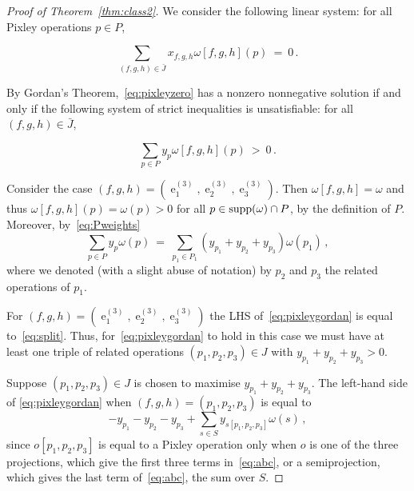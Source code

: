 \documentclass[11pt, reqno]{article}
\DeclareMathOperator{\proj}{\ensuremath{e}}
\newcommand{\tuple}[1]{\ensuremath{(#1)}}
\DeclareMathOperator{\supp}{{\rm supp}}
\theoremstyle{remark}
\begin{document}
\begin{proof}[Proof of Theorem~\ref{thm:class2}]
  We consider the following
  linear system: for all Pixley operations $p\in P$,
  
  \begin{equation} \label{eq:pixleyzero} \sum_{(f,g,h) \in \bar{J}}x_{f,g,h}\omega[f,g,h](p)\ =\ 0\,. \end{equation}
  
  By Gordan's Theorem,~\eqref{eq:pixleyzero} has a nonzero nonnegative solution
  if and only if the following system of strict
  inequalities is unsatisfiable: for all $(f,g,h) \in \bar{J}$,
  
  \begin{equation} \label{eq:pixleygordan} \sum_{p \in P}y_p\omega[f,g,h](p)\ >\
  0\,. \end{equation}

  Consider the case $\tuple{f,g,h}=\tuple{\proj^{(3)}_1,\proj^{(3)}_2,\proj^{(3)}_3}$.
  Then $\omega[f,g,h]=\omega$ and thus $\omega[f,g,h](p)=\omega(p)>0$ for all
  $p\in \supp(\omega)\cap P$,
  by the definition of $P$. Moreover, by~\eqref{eq:Pweights} 
  \begin{equation}\label{eq:split}
  \sum_{p\in P}y_p\omega(p) \ =\ \sum_{p_1\in
  P_1}(y_{p_1}+y_{p_2}+y_{p_3})\omega(p_1)\,,
  \end{equation} 
  where we denoted (with a slight abuse of notation) by $p_2$ and $p_3$ the related operations of $p_1$.
 
  For $\tuple{f,g,h} = \tuple{\proj^{(3)}_1,\proj^{(3)}_2,\proj^{(3)}_3}$ 
  the LHS of~\eqref{eq:pixleygordan} is equal to~\eqref{eq:split}. Thus,
  for~\eqref{eq:pixleygordan} to hold in this case
  we must have at least one
  triple of related operations $\tuple{p_1,p_2,p_3} \in J$ with $y_{p_1} + y_{p_2} + y_{p_3} > 0$. 
  
  
  Suppose $\tuple{p_1,p_2,p_3}\in J$ is chosen
  to maximise
  $y_{p_1} + y_{p_2} + y_{p_3}$. 
  The left-hand side of \eqref{eq:pixleygordan} when
  $\tuple{f,g,h} = \tuple{p_1,p_2,p_3}$ is equal to
  \begin{equation}\label{eq:abc}
    - y_{p_1} - y_{p_2} - y_{p_3} + \sum_{s \in S}y_{s[p_1,p_2,p_3]}\omega(s)\,,
  \end{equation}
  since $o[p_1,p_2,p_3]$ is equal to a Pixley operation only when $o$ is one
  of the three projections, which give the first three terms in~\eqref{eq:abc},
  or a semiprojection, which gives the last term of~\eqref{eq:abc}, the sum over $S$.


\end{proof}
\end{document}
